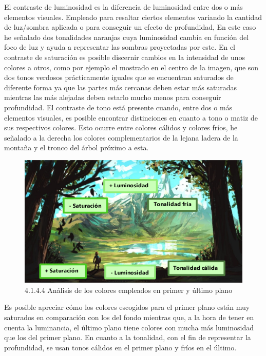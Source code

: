 \documentclass[12pt]{article}
\begin{document}
    El contraste de luminosidad es la diferencia de luminosidad entre dos o más elementos visuales. Empleado para resaltar ciertos elementos variando la cantidad de luz/sombra aplicada o para conseguir un efecto de profundidad, En este caso he señalado dos tonalidades naranjas cuya luminosidad cambia en función del foco de luz y ayuda a representar las sombras proyectadas por este. En el contraste de saturación es posible discernir cambios en la intensidad de unos colores a otros, como por ejemplo el mostrado en el centro de la imagen, que son dos tonos verdosos prácticamente iguales que se encuentran saturados de diferente forma ya que las partes más cercanas deben estar más saturadas mientras las más alejadas deben estarlo mucho menos para conseguir profundidad. El contraste de tono está presente cuando, entre dos o más elementos visuales, es posible encontrar distinciones en cuanto a tono o matiz de sus respectivos colores. Esto ocurre entre colores cálidos y colores fríos, he señalado a la derecha los colores complementarios de la lejana ladera de la montaña y el tronco del árbol próximo a esta.

    \begin{figure}[H]
      \centering
      \includegraphics[scale=0.4]{images/Nerea/Nerea Zelda concept 144.PNG}
      \caption{\small 4.1.4.4 Análisis de los colores empleados en primer y último plano}
    \end{figure}

    Es posible apreciar cómo los colores escogidos para el primer plano están muy saturados en comparación con los del fondo mientras que, a la hora de tener en cuenta la luminancia, el último plano tiene colores con mucha más luminosidad que los del primer plano. En cuanto a la tonalidad, con el fin de representar la profundidad, se usan tonos cálidos en el primer plano y fríos en el último.
        \newpage
\end{document}
